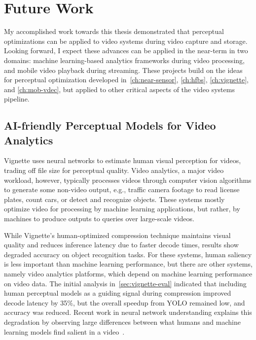 \chapter{Future Work}
\label{ch:proposed}

My accomplished work towards this thesis demonstrated that perceptual optimizations can be applied to video systems during video capture and storage.
Looking forward, I expect these advances can be applied in the near-term in two domains: machine learning-based analytics frameworks during video processing, and mobile video playback during streaming.
These projects build on the ideas for perceptual optimization developed in~\ref{ch:near-sensor}, \ref{ch:hfbs}, \ref{ch:vignette}, and \ref{ch:mob-vdec}, but applied to other critical aspects of the video systems pipeline.



\section{AI-friendly Perceptual Models for Video Analytics}
\label{sec:mach-vign}
Vignette uses neural networks to estimate human visual perception for videos, trading off file size for perceptual quality.
Video analytics, a major video workload, however, typically processes videos through computer vision algorithms to generate some non-video output, e.g., traffic camera footage to read license plates, count cars, or detect and recognize objects.
These systems mostly optimize video for processing by machine learning applications, but rather, by machines to produce outputs to queries over large-scale videos.

While Vignette's human-optimized compression technique maintains visual quality and reduces inference latency due to faster decode times, results show degraded accuracy on object recognition tasks.
For these systems, human saliency is less important than machine learning performance, but there are other systems, namely video analytics platforms, which depend on machine learning performance on video data.
The initial analysis in~\ref{sec:vignette-eval} indicated that including human perceptual models as a guiding signal during compression improved decode latency by 35\%, but the overall speedup from YOLO remained low, and accuracy was reduced.
Recent work in neural network understanding explains this degradation by observing large differences between what humans and machine learning models find salient in a video~\cite{olah2018the}.

